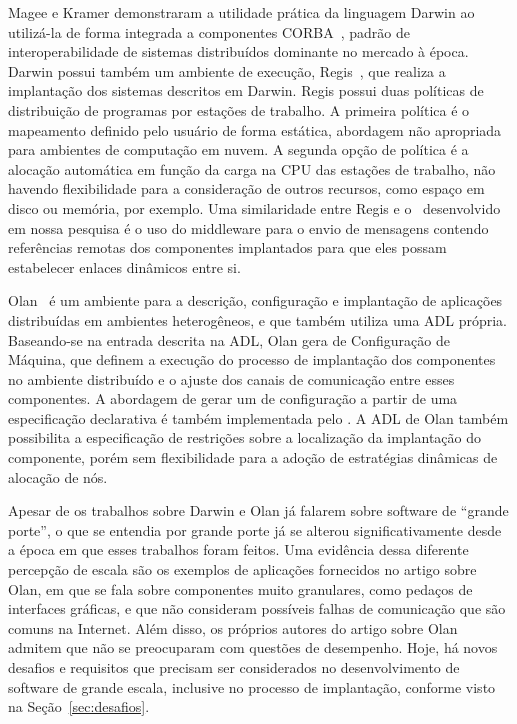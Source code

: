 Magee e Kramer demonstraram a utilidade prática da linguagem Darwin ao utilizá-la de forma integrada a componentes CORBA~\cite{Magee1997Corba}, padrão de interoperabilidade de sistemas distribuídos dominante no mercado à época. Darwin possui também um ambiente de execução, Regis~\cite{Magee1994Regis}, que realiza a implantação dos sistemas descritos em Darwin. Regis possui duas políticas de distribuição de programas por estações de trabalho. A primeira política é o mapeamento definido pelo usuário de forma estática, abordagem não apropriada para ambientes de computação em nuvem. A segunda opção de política é a alocação automática em função da carga na CPU das estações de trabalho, não havendo flexibilidade para a consideração de outros recursos, como espaço em disco ou memória, por exemplo. Uma similaridade entre Regis e o \ee\ desenvolvido em nossa pesquisa é o uso do middleware para o envio de mensagens contendo referências remotas dos componentes implantados para que eles possam estabelecer enlaces dinâmicos entre si.

Olan~\cite{Balter1998Olan} é um ambiente para a descrição, configuração e implantação de aplicações distribuídas em ambientes heterogêneos, e que também utiliza uma ADL própria. Baseando-se na entrada descrita na ADL, Olan gera \scripts de Configuração de Máquina, que definem a execução do processo de implantação dos componentes no ambiente distribuído e o ajuste dos canais de comunicação entre esses componentes. A abordagem de gerar um \script de configuração a partir de uma especificação declarativa é também implementada pelo \ee. A ADL de Olan também possibilita a especificação de restrições sobre a localização da implantação do componente, porém sem flexibilidade para a adoção de estratégias dinâmicas de alocação de nós.

Apesar de os trabalhos sobre Darwin e Olan já falarem sobre software de ``grande porte'', o que se entendia por grande porte já se alterou significativamente desde a época em que esses trabalhos foram feitos. Uma evidência dessa diferente percepção de escala são os exemplos de aplicações fornecidos no artigo sobre Olan, em que se fala sobre componentes muito granulares, como pedaços de interfaces gráficas, e que não consideram possíveis falhas de comunicação que são comuns na Internet. Além disso, os próprios autores do artigo sobre Olan admitem que não se preocuparam com questões de desempenho. 
Hoje, há novos  desafios e requisitos que precisam ser considerados no desenvolvimento de software 
de grande escala, inclusive no processo de implantação, conforme visto na Seção~\ref{sec:desafios}.

